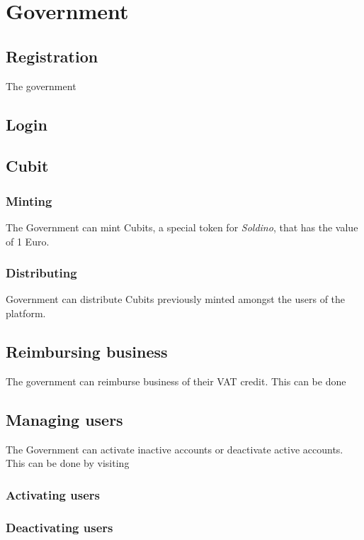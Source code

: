 \section{Government}
	\subsection{Registration}
	The government
	\subsection{Login}
	
	\subsection{Cubit}
		\subsubsection{Minting}
		The Government can mint Cubits, a special token for \textit{Soldino}, that 
		has the value of 1 Euro.
		\subsubsection{Distributing}
		Government can distribute Cubits previously minted amongst the users of 
		the platform.
	\subsection{Reimbursing business}
	The government can reimburse business of their VAT credit. This can be done 
	\subsection{Managing users}
	The Government can activate inactive accounts or deactivate active accounts.
	This can be done by visiting %
		\subsubsection{Activating users}
		
		\subsubsection{Deactivating users}
		
		